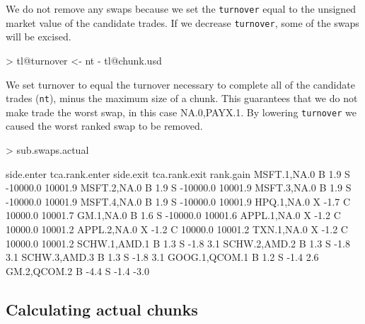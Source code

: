 \documentclass{article}
\begin{document}
We do not remove any swaps because we set the \texttt{turnover} equal
to the unsigned market value of the candidate trades.  If we
decrease \texttt{turnover}, some of the swaps will be excised.


\begin{Schunk}
\begin{Sinput}
> tl@turnover <- nt - tl@chunk.usd
\end{Sinput}
\end{Schunk}

We set turnover to equal the turnover necessary to complete all of the
candidate trades (\texttt{nt}), minus the maximum size of a chunk.
This guarantees that we do not make trade the worst swap, in this case
NA.0,PAYX.1.  By lowering
\texttt{turnover} we caused the worst ranked swap to be removed.



\begin{Schunk}
\begin{Sinput}
> sub.swaps.actual
\end{Sinput}
\begin{Soutput}
              side.enter tca.rank.enter side.exit tca.rank.exit rank.gain
MSFT.1,NA.0            B            1.9         S      -10000.0   10001.9
MSFT.2,NA.0            B            1.9         S      -10000.0   10001.9
MSFT.3,NA.0            B            1.9         S      -10000.0   10001.9
MSFT.4,NA.0            B            1.9         S      -10000.0   10001.9
HPQ.1,NA.0             X           -1.7         C       10000.0   10001.7
GM.1,NA.0              B            1.6         S      -10000.0   10001.6
APPL.1,NA.0            X           -1.2         C       10000.0   10001.2
APPL.2,NA.0            X           -1.2         C       10000.0   10001.2
TXN.1,NA.0             X           -1.2         C       10000.0   10001.2
SCHW.1,AMD.1           B            1.3         S          -1.8       3.1
SCHW.2,AMD.2           B            1.3         S          -1.8       3.1
SCHW.3,AMD.3           B            1.3         S          -1.8       3.1
GOOG.1,QCOM.1          B            1.2         S          -1.4       2.6
GM.2,QCOM.2            B           -4.4         S          -1.4      -3.0
\end{Soutput}
\end{Schunk}




\subsection{Calculating actual chunks}
\end{document}
